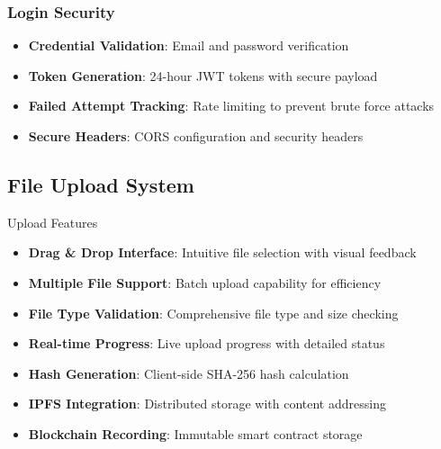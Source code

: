 \documentclass[11pt,a4paper]{article}
\begin{document}
\subsubsection{Login Security}
\begin{itemize}
    \item \textbf{Credential Validation}: Email and password verification
    \item \textbf{Token Generation}: 24-hour JWT tokens with secure payload
    \item \textbf{Failed Attempt Tracking}: Rate limiting to prevent brute force attacks
    \item \textbf{Secure Headers}: CORS configuration and security headers
\end{itemize}

\subsection{File Upload System}

\begin{featurebox}{\faCloudUploadAlt\space Upload Features}
\begin{itemize}
    \item \textbf{Drag \& Drop Interface}: Intuitive file selection with visual feedback
    \item \textbf{Multiple File Support}: Batch upload capability for efficiency
    \item \textbf{File Type Validation}: Comprehensive file type and size checking
    \item \textbf{Real-time Progress}: Live upload progress with detailed status
    \item \textbf{Hash Generation}: Client-side SHA-256 hash calculation
    \item \textbf{IPFS Integration}: Distributed storage with content addressing
    \item \textbf{Blockchain Recording}: Immutable smart contract storage
\end{itemize}
\end{featurebox}
\end{document}
